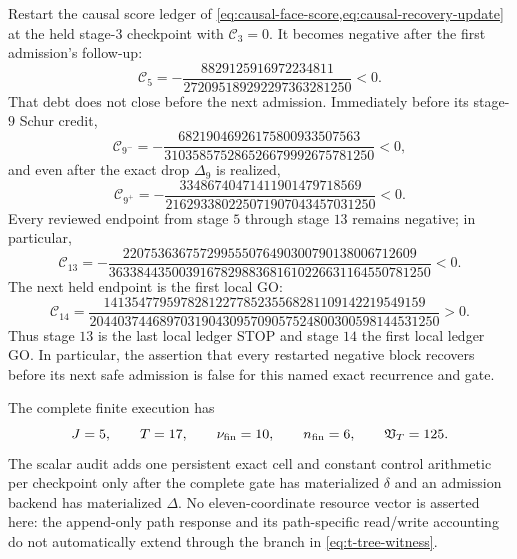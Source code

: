 \begin{proposition}
Restart the causal score ledger of
\cref{eq:causal-face-score,eq:causal-recovery-update} at the held stage-$3$
checkpoint with $\mathcal C_3=0$.  It becomes negative after the first
admission's follow-up:
\begin{equation}
 \mathcal C_5
 =-\frac{8829125916972234811}
 {272095189292297363281250}<0.
 \label{eq:t-tree-stage-five-stop}
\end{equation}
That debt does not close before the next admission.  Immediately before its
stage-$9$ Schur credit,
\begin{equation}
 \mathcal C_{9^-}
 =-\frac{68219046926175800933507563}
 {310358575286526679992675781250}<0,
 \label{eq:t-tree-stage-nine-pre-stop}
\end{equation}
and even after the exact drop $\Delta_9$ is realized,
\begin{equation}
 \mathcal C_{9^+}
 =-\frac{33486740471411901479718569}
 {216293380225071907043457031250}<0.
 \label{eq:t-tree-stage-nine-post-stop}
\end{equation}
Every reviewed endpoint from stage $5$ through stage $13$ remains negative;
in particular,
\begin{equation*}
 \mathcal C_{13}
 =-\frac{220753636757299555076490300790138006712609}
 {3633844350039167829883681610226631164550781250}<0.
\end{equation*}
The next held endpoint is the first local GO:
\begin{equation}
 \mathcal C_{14}
 =\frac{1413547795978281227785235568281109142219549159}
 {20440374468970319043095709057524800300598144531250}>0.
 \label{eq:t-tree-stage-fourteen-go}
\end{equation}
Thus stage $13$ is the last local ledger STOP and stage $14$ the first local
ledger GO.  In particular, the assertion that every restarted negative block
recovers before its next safe admission is false for this named exact
recurrence and gate.

The complete finite execution has
\begin{equation}
 J=5,
 \qquad T=17,
 \qquad \nu_{\rm fin}=10,
 \qquad n_{\rm fin}=6,
 \qquad \mathfrak V_T=125.
 \label{eq:t-tree-finite-ledger}
\end{equation}
The scalar audit adds one persistent exact cell and constant control arithmetic
per checkpoint only after the complete gate has materialized $\delta$ and an
admission backend has materialized $\Delta$.  No eleven-coordinate resource
vector is asserted here: the append-only path response and its path-specific
read/write accounting do not automatically extend through the branch in
\cref{eq:t-tree-witness}.
\end{proposition}

